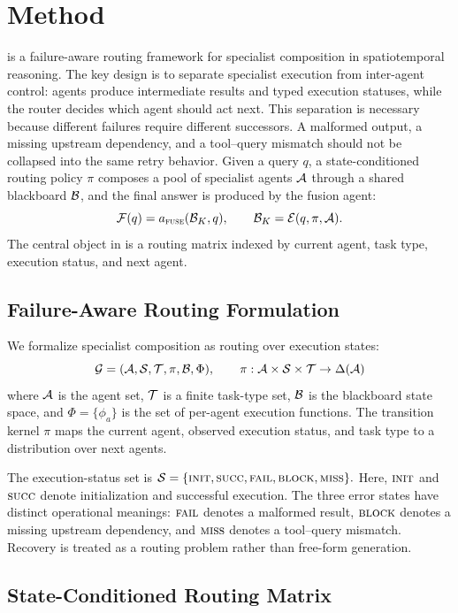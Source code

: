 \section{Method}
\label{sec:method}


\starname{} is a failure-aware routing framework for specialist composition in spatiotemporal reasoning.
The key design is to separate specialist execution from inter-agent control: agents produce intermediate results and typed execution statuses, while the router decides which agent should act next.
This separation is necessary because different failures require different successors.
A malformed output, a missing upstream dependency, and a tool--query mismatch should not be collapsed into the same retry behavior.
Given a query $q$, a state-conditioned routing policy $\pi$ composes a pool of specialist agents $\mathcal{A}$ through a shared blackboard $\mathcal{B}$, and the final answer is produced by the fusion agent:
\[
\mathcal{F}(q) = a_{\textnormal{\textsc{fuse}}}(\mathcal{B}_K, q), \qquad \mathcal{B}_K = \mathcal{E}(q, \pi, \mathcal{A}).
\]
The central object in \starname{} is a routing matrix indexed by current agent, task type, execution status, and next agent.

\subsection{Failure-Aware Routing Formulation}
\label{sec:formulation}

We formalize specialist composition as routing over execution states:
\[
\mathcal{G} = (\mathcal{A}, \mathcal{S}, \mathcal{T}, \pi, \mathcal{B}, \Phi), \qquad
\pi: \mathcal{A} \times \mathcal{S} \times \mathcal{T} \to \Delta(\mathcal{A})
\]
where $\mathcal{A}$ is the agent set, $\mathcal{T}$ is a finite task-type set, $\mathcal{B}$ is the blackboard state space, and $\Phi=\{\phi_a\}$ is the set of per-agent execution functions.
The transition kernel $\pi$ maps the current agent, observed execution status, and task type to a distribution over next agents.

The execution-status set is $\mathcal{S} = \{\textnormal{\textsc{init}},\textnormal{\textsc{succ}},\textnormal{\textsc{fail}},\textnormal{\textsc{block}},\textnormal{\textsc{miss}}\}.$
Here, $\textnormal{\textsc{init}}$ and $\textnormal{\textsc{succ}}$ denote initialization and successful execution.
The three error states have distinct operational meanings:
$\textnormal{\textsc{fail}}$ denotes a malformed result, $\textnormal{\textsc{block}}$ denotes a missing upstream dependency, and $\textnormal{\textsc{miss}}$ denotes a tool--query mismatch.
Recovery is treated as a routing problem rather than free-form generation.

\subsection{State-Conditioned Routing Matrix}
\label{sec:routing}


